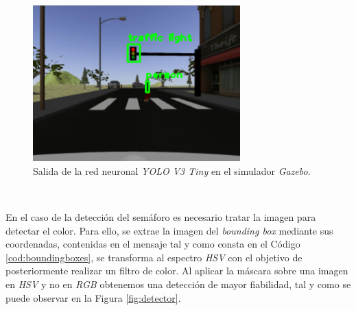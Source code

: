 \begin{figure} [h!]
	\begin{center}
		\includegraphics[width=8cm]{figs/darknetSimulator}
	\end{center}
	\caption{Salida de la red neuronal \textit{YOLO V3 Tiny} en el simulador \textit{Gazebo}.}
	\label{fig:darknetsimulator}
\end{figure}\

En el caso de la detección del semáforo es necesario tratar la imagen para detectar el color. Para ello, se extrae la imagen del \textit{bounding box} mediante sus coordenadas,
contenidas en el mensaje tal y como consta en el Código \ref{cod:boundingboxes}, se transforma al espectro \textit{HSV} con el objetivo de posteriormente realizar un filtro de
color. Al aplicar la máscara sobre una imagen en \textit{HSV} y no en \textit{RGB} obtenemos una detección de mayor fiabilidad, tal y como se puede observar en la Figura
\ref{fig:detector}.\\

